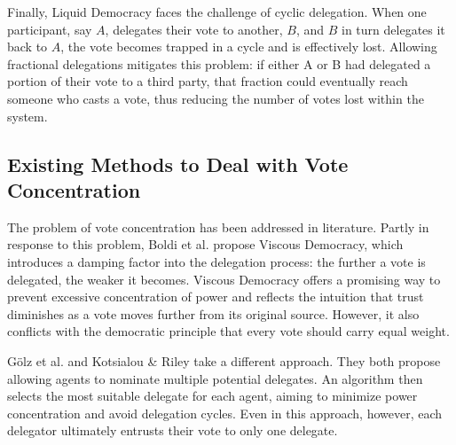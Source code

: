 Finally, Liquid Democracy faces the challenge of cyclic delegation. When one participant, say $A$, delegates their vote to another, $B$, and $B$ in turn delegates it back to $A$, the vote becomes trapped in a cycle and is effectively lost. \cite{behrensCircularDelegationsMyth2015} Allowing fractional delegations mitigates this problem: if either A or B had delegated a portion of their vote to a third party, that fraction could eventually reach someone who casts a vote, thus reducing the number of votes lost within the system.

\subsection{Existing Methods to Deal with Vote Concentration}

The problem of vote concentration has been addressed in literature. Partly in response to this problem, Boldi et al. propose Viscous Democracy, which introduces a damping factor into the delegation process: the further a vote is delegated, the weaker it becomes. Viscous Democracy offers a promising way to prevent excessive concentration of power and reflects the intuition that trust diminishes as a vote moves further from its original source. However, it also conflicts with the democratic principle that every vote should carry equal weight. \cite{boldiViscousDemocracySocial2011} 

Gölz et al. and Kotsialou \& Riley take a different approach. They both propose allowing agents to nominate multiple potential delegates. An algorithm then selects the most suitable delegate for each agent, aiming to minimize power concentration and avoid delegation cycles. Even in this approach, however, each delegator ultimately entrusts their vote to only one delegate. \cite{kotsialouIncentivisingParticipationLiquid2019, golzFluidMechanicsLiquid2021}
